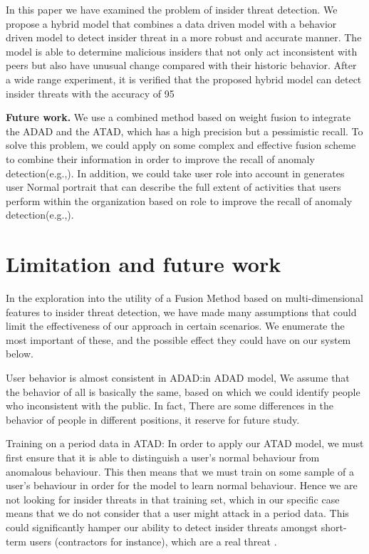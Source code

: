 \documentclass[conference]{IEEEtran}
\begin{document}
In this paper we have examined the problem of insider threat detection. We propose a hybrid model that combines a data driven model with a behavior driven model to detect insider threat in a more robust and accurate manner. The model is able to determine malicious insiders that not only act inconsistent with peers but also have unusual change compared with their historic behavior. After a wide range experiment, it is verified that the proposed hybrid model can detect insider threats with the accuracy of 95%


\textbf{Future work.}
We use a combined method based on weight fusion to integrate the ADAD and the ATAD, which has a high precision but a pessimistic recall. To solve this problem, we could apply on some complex and effective fusion scheme to combine their information in order to improve the recall of anomaly detection(e.g.,\cite{b49}).  In addition, we could take user role into account in generates user Normal portrait that can describe the full extent of activities that users perform within the organization based on role to improve the recall of anomaly detection(e.g.,\cite{b50}).   	

\iffalse
\section{Limitation and future work}

In the exploration into the utility of a Fusion Method based on multi-dimensional features to insider threat detection, we have made many assumptions that could limit the effectiveness of our approach in certain scenarios. We enumerate the most important of these, and the possible effect they could have on our system below.

User behavior is almost consistent in ADAD:in ADAD model, We assume that the behavior of all is basically the same, based on which we could identify people who inconsistent with the public. In fact, There are some differences in the behavior of people in different positions, it reserve for future study.

Training on a period data in ATAD: 
In order to apply our ATAD model, we must first ensure that it is able to distinguish a user’s normal behaviour from anomalous behaviour. This then means that we must train on some sample of a user’s behaviour in order for the model to learn normal behaviour. Hence we are not looking for insider threats in that training set, which in our specific case means that we do not consider that a user might attack in a period data. This could significantly hamper our ability to detect insider threats amongst short-term users (contractors for instance), which are a real threat \cite{b48}.
\end{document}
